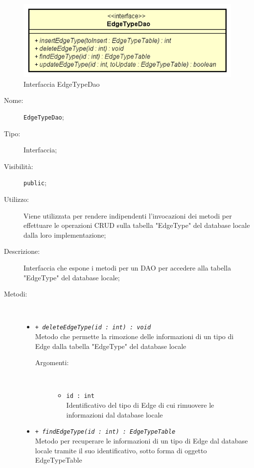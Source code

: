 \documentclass[../DefinizioneDiProdotto.tex]{subfiles}
\begin{document}
    \begin{figure}[H]
        \centering
        \includegraphics{img/EdgeTypeDao.png}
        \caption{Interfaccia EdgeTypeDao}\label{fig:model::dataaccess::dao::EdgeTypeDao} 
    \end{figure}
    \begin{description}
\item[Nome:] \texttt{EdgeTypeDao};
\item[Tipo:] Interfaccia;
\item[Visibilità:] \texttt{public};
\item[Utilizzo:] Viene utilizzata per rendere indipendenti l'invocazioni dei metodi per effettuare le operazioni CRUD sulla tabella "EdgeType" del database locale dalla loro implementazione;
\item[Descrizione:] Interfaccia che espone i metodi per un DAO per accedere alla tabella "EdgeType" del database locale;
\item[Metodi:] \
\begin{itemize}
\item \texttt{+ \textit{deleteEdgeType(id : int) : void}}\\
Metodo che permette la rimozione delle informazioni di un tipo di Edge dalla tabella "EdgeType" del database locale
 \begin{description}
\item[Argomenti:] \
\begin{itemize}
\item \texttt{id : int}\\
Identificativo del tipo di Edge di cui rimuovere le informazioni dal database locale\end{itemize}
\end{description}
\item \texttt{+ \textit{findEdgeType(id : int) : EdgeTypeTable}}\\
Metodo per recuperare le informazioni di un tipo di Edge dal database locale tramite il suo identificativo, sotto forma di oggetto EdgeTypeTable
 \begin{description}

\end{description}
\end{itemize}
\end{description}
\end{document}
